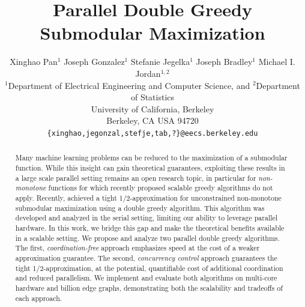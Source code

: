 \documentclass{article} %
\title{Parallel Double Greedy Submodular Maximization}
\author{
Xinghao Pan$^1$ Joseph Gonzalez$^1$ Stefanie Jegelka$^1$ Joseph Bradley$^{1}$ Michael I. Jordan$^{1,2}$\\
$^1$Department of Electrical Engineering and Computer Science, and $^2$Department of Statistics\\
University of California, Berkeley\\
Berkeley, CA USA 94720\\
  \texttt{\{xinghao,jegonzal,stefje,tab,?\}@eecs.berkeley.edu} \\
}
\begin{document}
\maketitle


\begin{abstract}
Many machine learning problems can be reduced to the maximization of a submodular function. While this insight can gain theoretical guarantees, exploiting these results in a large scale parallel setting remains an open research topic, in particular for \emph{non-monotone} functions for which recently proposed scalable greedy algorithms do not apply. Recently, \citet{buchbinder2012} achieved a tight 1/2-approximation for unconstrained non-monotone submodular maximization using a double greedy algorithm. This algorithm was developed and analyzed in the serial setting, limiting our ability to leverage parallel hardware. In this work, we bridge this gap and make the theoretical benefits available in a scalable setting.
We propose and analyze two parallel double greedy algorithms.
The first, \emph{coordination-free} approach emphasizes speed at the cost of a weaker approximation guarantee.
The second, \emph{concurrency control} approach guarantees the tight 1/2-approximation, at the potential, quantifiable cost of additional coordination and reduced parallelism.
We implement and evaluate both algorithms on multi-core hardware and billion edge graphs, demonstrating both the scalability and tradeoffs of each approach.
%
%


\end{abstract}
\end{document}
